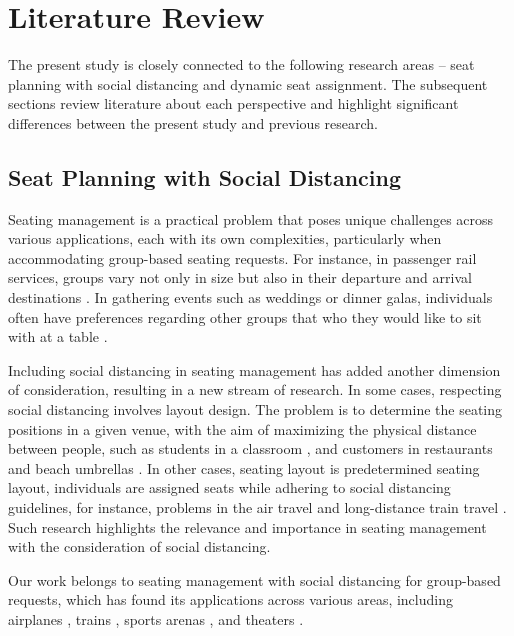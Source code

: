 \section{Literature Review}\label{literature}
The present study is closely connected to the following research areas -- seat planning with social distancing and dynamic seat assignment. The subsequent sections review literature about each perspective and highlight significant differences between the present study and previous research.


\subsection{Seat Planning with Social Distancing}

Seating management is a practical problem that poses unique challenges across various applications, each with its own complexities, particularly when accommodating group-based seating requests. For instance, in passenger rail services, groups vary not only in size but also in their departure and arrival destinations 
\cite{clausen2010off, deplano2019offline}. In gathering events such as weddings or dinner galas, individuals often have preferences regarding other groups that who they would like to sit with at a table \cite{lewis2016creating}. 

Including social distancing in seating management has added another dimension of consideration, resulting in a new stream of research. In some cases, respecting social distancing involves layout design. The problem is to determine the seating positions  in a given venue, with the aim of maximizing the physical distance between people, such as students in a classroom \cite{bortolete2022support}, and customers  in restaurants and beach umbrellas \cite{fischetti2023safe}. In other cases, seating layout is predetermined seating layout, individuals are assigned seats while adhering to social distancing guidelines, for instance, problems in the air travel \cite{ghorbani2020model} and long-distance train travel \cite{haque2022optimization}. Such research  highlights the relevance and importance in seating management with the consideration of social distancing.


Our work belongs to seating management with social distancing for group-based requests, which has found its applications across various areas, including airplanes \cite{salari2022social}, trains \cite{haque2023social}, sports arenas \cite{kwag2022optimal}, and theaters \cite{blom2022filling}. 

